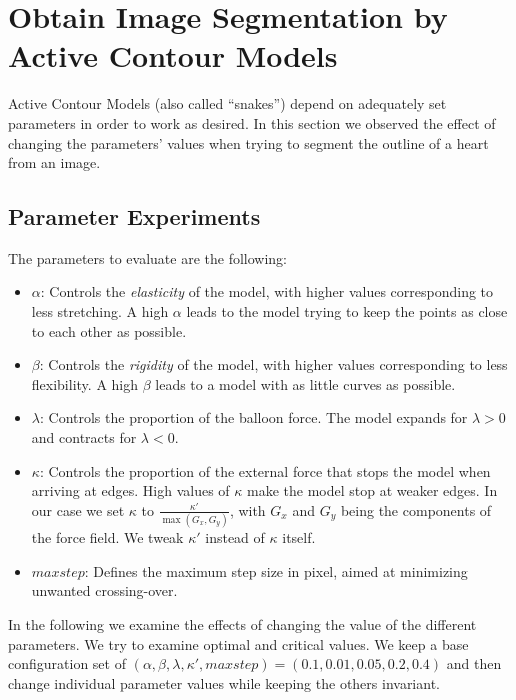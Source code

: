 \section{Obtain Image Segmentation by Active Contour Models}

Active Contour Models (also called ``snakes'') depend on adequately set parameters in order to work as desired. In this section we observed the effect of changing the parameters' values when trying to segment the outline of a heart from an image.

\subsection{Parameter Experiments}
\label{sub:params}

The parameters to evaluate are the following:

\begin{itemize}

	\item $\alpha$: Controls the \textit{elasticity} of the model, with higher values corresponding to less stretching. A high $\alpha$ leads to the model trying to keep the points as close to each other as possible.
	
	\item $\beta$: Controls the \textit{rigidity} of the model, with higher values corresponding to less flexibility. A high $\beta$ leads to a model with as little curves as possible.
	
	\item $\lambda$: Controls the proportion of the balloon force. The model expands for $\lambda > 0$ and contracts for $\lambda < 0$.
	
	\item $\kappa$: Controls the proportion of the external force that stops the model when arriving at edges. High values of $\kappa$ make the model stop at weaker edges. In our case we set $ \kappa $ to $ \frac{\kappa'}{\max (G_x, G_y)} $, with $ G_x $ and $ G_y $ being the components of the force field. We tweak $ \kappa' $ instead of $ \kappa $ itself.
	
	\item $maxstep$: Defines the maximum step size in pixel, aimed at minimizing unwanted crossing-over.
	
\end{itemize}

In the following we examine the effects of changing the value of the different parameters. We try to examine optimal and critical values. We keep a base configuration set of $(\alpha , \beta , \lambda , \kappa' , maxstep) = (0.1 , 0.01 , 0.05 , 0.2 , 0.4)$ and then change individual parameter values while keeping the others invariant.

